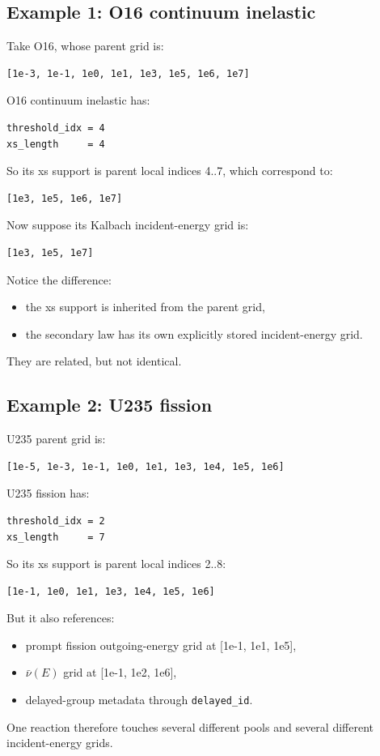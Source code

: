 \documentclass[11pt,a4paper]{article}
\begin{document}
\subsection{Example 1: O16 continuum inelastic}
Take O16, whose parent grid is:
\begin{lstlisting}
[1e-3, 1e-1, 1e0, 1e1, 1e3, 1e5, 1e6, 1e7]
\end{lstlisting}
O16 continuum inelastic has:
\begin{lstlisting}
threshold_idx = 4
xs_length     = 4
\end{lstlisting}
So its xs support is parent local indices 4..7, which correspond to:
\begin{lstlisting}
[1e3, 1e5, 1e6, 1e7]
\end{lstlisting}
Now suppose its Kalbach incident-energy grid is:
\begin{lstlisting}
[1e3, 1e5, 1e7]
\end{lstlisting}
Notice the difference:
\begin{itemize}[leftmargin=1.4em]
  \item the xs support is inherited from the parent grid,
  \item the secondary law has its own explicitly stored incident-energy grid.
\end{itemize}
They are related, but not identical.

\subsection{Example 2: U235 fission}
U235 parent grid is:
\begin{lstlisting}
[1e-5, 1e-3, 1e-1, 1e0, 1e1, 1e3, 1e4, 1e5, 1e6]
\end{lstlisting}
U235 fission has:
\begin{lstlisting}
threshold_idx = 2
xs_length     = 7
\end{lstlisting}
So its xs support is parent local indices 2..8:
\begin{lstlisting}
[1e-1, 1e0, 1e1, 1e3, 1e4, 1e5, 1e6]
\end{lstlisting}
But it also references:
\begin{itemize}[leftmargin=1.4em]
  \item prompt fission outgoing-energy grid at [1e-1, 1e1, 1e5],
  \item $\bar\nu(E)$ grid at [1e-1, 1e2, 1e6],
  \item delayed-group metadata through \texttt{delayed\_id}.
\end{itemize}
One reaction therefore touches several different pools and several different incident-energy grids.
\end{document}
